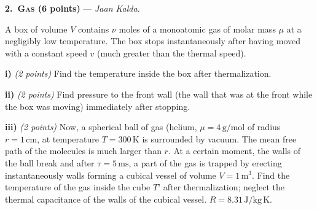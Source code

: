 \textbf{2.\ \textsc{Gas} (6 points)} --- \textit{Jaan Kalda.}

A box of volume $V$ contains $\nu$ moles of a monoatomic gas of molar mass $\mu$
at a negligibly low temperature. The box stops instantaneously after having
moved with a constant speed $v$ (much greater than the thermal speed).

\textbf{i)} \textit{(2 points)} Find the temperature inside the box after
thermalization.

\textbf{ii)} \textit{(2 points)} Find pressure to the front wall (the wall that
was at the front while the box was moving) immediately after stopping.

\textbf{iii)} \textit{(2 points)} Now, a spherical ball of gas (helium,
$\mu = 4\,\mathrm{g/mol}$ of radius $r = 1\,\mathrm{cm}$, at temperature
$T = 300\,\mathrm{K}$ is surrounded by vacuum. The mean free path of the
molecules is much larger than $r$. At a certain moment, the walls of the ball
break and after $\tau = 5\,\mathrm{ms}$, a part of the gas is trapped by erecting
instantaneously walls forming a cubical vessel of volume $V = 1\,\mathrm{m^3}$.
Find the temperature of the gas inside the cube $T$' after thermalization;
neglect the thermal capacitance of the walls of the cubical vessel.
$R = 8.31\,\mathrm{J/kg\,K}$.
